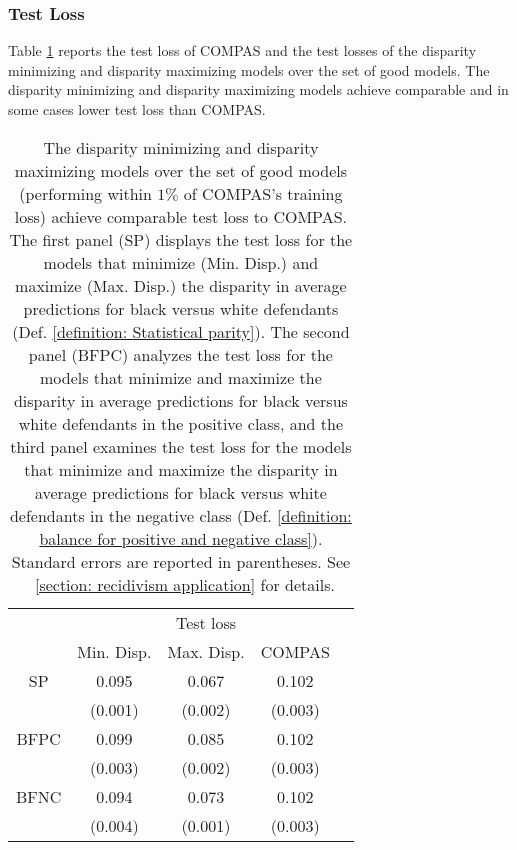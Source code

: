 \documentclass{article}
\begin{document}
\subsubsection{Test Loss}\label{section: race test loss performance}

Table \ref{table: Compas Race - ref model compas Test, loss} reports the test loss of COMPAS and the test losses of the disparity minimizing and disparity maximizing models over the set of good models. The disparity minimizing and disparity maximizing models achieve comparable and in some cases lower test loss than COMPAS.

\begin{table}[t]
\caption{The disparity minimizing and disparity maximizing models over the set of good models (performing within $1\%$ of COMPAS's training loss) achieve comparable test loss to COMPAS. The first panel (SP) displays the test loss for the models that minimize (Min. Disp.) and maximize (Max. Disp.) the disparity in average predictions for black versus white defendants (Def. \ref{definition: Statistical parity}). The second panel (BFPC) analyzes the test loss for the models that minimize and maximize the disparity in average predictions for black versus white defendants in the positive class, and the third panel examines the test loss for the models that minimize and maximize the disparity in average predictions for black versus white defendants in the negative class (Def. \ref{definition: balance for positive and negative class}). Standard errors are reported in parentheses. See \textsection~\ref{section: recidivism application} for details.}
\label{table: Compas Race - ref model compas Test, loss}
\vskip 0.05in
\begin{center}
\begin{small}
\begin{sc}
\begin{tabular}{c cccr}
\toprule
& & Test loss & & \\
& Min. Disp. & Max. Disp.  & COMPAS \\
\midrule
SP & 0.095 & 0.067 & 0.102 \\
& (0.001) & (0.002) & (0.003) \\
\midrule 
BFPC & 0.099 & 0.085 & 0.102 \\
& (0.003) & (0.002) & (0.003) \\
\midrule
BFNC & 0.094 & 0.073 & 0.102 \\
& (0.004) & (0.001) & (0.003) \\
\bottomrule
\end{tabular}
\end{sc}
\end{small}
\end{center}
\vskip -0.1in
\end{table}
\end{document}
